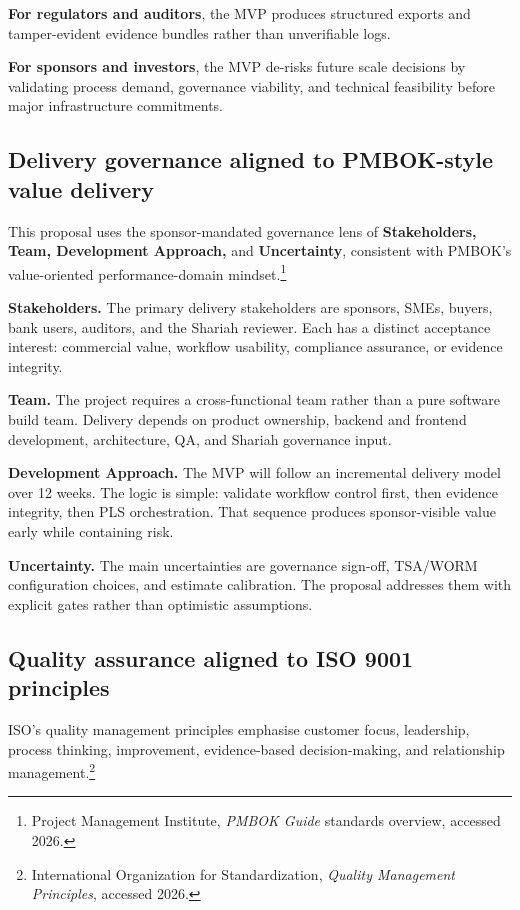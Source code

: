 \documentclass[11pt,a4paper]{article}
\begin{document}
\textbf{For regulators and auditors}, the MVP produces structured exports and tamper-evident evidence bundles rather than unverifiable logs.

\textbf{For sponsors and investors}, the MVP de-risks future scale decisions by validating process demand, governance viability, and technical feasibility before major infrastructure commitments.

\subsection{Delivery governance aligned to PMBOK-style value delivery}

This proposal uses the sponsor-mandated governance lens of \textbf{Stakeholders, Team, Development Approach,} and \textbf{Uncertainty}, consistent with PMBOK's value-oriented performance-domain mindset.\footnote{Project Management Institute, \emph{PMBOK Guide} standards overview, accessed 2026.}

\textbf{Stakeholders.} The primary delivery stakeholders are sponsors, SMEs, buyers, bank users, auditors, and the Shariah reviewer. Each has a distinct acceptance interest: commercial value, workflow usability, compliance assurance, or evidence integrity.

\textbf{Team.} The project requires a cross-functional team rather than a pure software build team. Delivery depends on product ownership, backend and frontend development, architecture, QA, and Shariah governance input.

\textbf{Development Approach.} The MVP will follow an incremental delivery model over 12 weeks. The logic is simple: validate workflow control first, then evidence integrity, then PLS orchestration. That sequence produces sponsor-visible value early while containing risk.

\textbf{Uncertainty.} The main uncertainties are governance sign-off, TSA/WORM configuration choices, and estimate calibration. The proposal addresses them with explicit gates rather than optimistic assumptions.

\subsection{Quality assurance aligned to ISO 9001 principles}

ISO's quality management principles emphasise customer focus, leadership, process thinking, improvement, evidence-based decision-making, and relationship management.\footnote{International Organization for Standardization, \emph{Quality Management Principles}, accessed 2026.}
\end{document}
